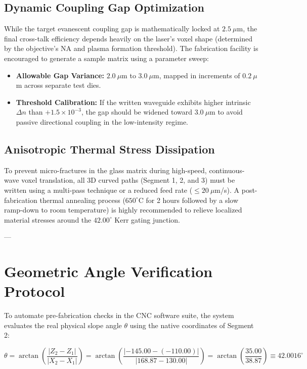 \documentclass[11pt,a4paper]{article}
\begin{document}
\subsection{Dynamic Coupling Gap Optimization}
While the target evanescent coupling gap is mathematically locked at $2.5\ \mu$m, the final cross-talk efficiency depends heavily on the laser's voxel shape (determined by the objective's NA and plasma formation threshold). The fabrication facility is encouraged to generate a sample matrix using a parameter sweep:
\begin{itemize}
    \item \textbf{Allowable Gap Variance:} $2.0\ \mu$m to $3.0\ \mu$m, mapped in increments of $0.2\ \mu$m across separate test dies.
    \item \textbf{Threshold Calibration:} If the written waveguide exhibits higher intrinsic $\Delta n$ than $+1.5 \times 10^{-3}$, the gap should be widened toward $3.0\ \mu$m to avoid passive directional coupling in the low-intensity regime.
\end{itemize}

\subsection{Anisotropic Thermal Stress Dissipation}
To prevent micro-fractures in the glass matrix during high-speed, continuous-wave voxel translation, all 3D curved paths (Segment 1, 2, and 3) must be written using a multi-pass technique or a reduced feed rate ($\le 20\ \mu$m/s). A post-fabrication thermal annealing process ($650^\circ\text{C}$ for 2 hours followed by a slow ramp-down to room temperature) is highly recommended to relieve localized material stresses around the $42.00^\circ$ Kerr gating junction.

---

\section{Geometric Angle Verification Protocol}
To automate pre-fabrication checks in the CNC software suite, the system evaluates the real physical slope angle $\theta$ using the native coordinates of Segment 2:

\begin{equation}
\theta = \arctan\left(\frac{|Z_2 - Z_1|}{|X_2 - X_1|}\right) = \arctan\left(\frac{|-145.00 - (-110.00)|}{|168.87 - 130.00|}\right) = \arctan\left(\frac{35.00}{38.87}\right) \equiv 42.0016^\circ
\end{equation}
\end{document}
